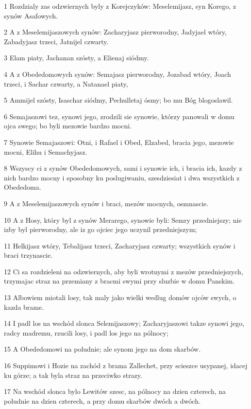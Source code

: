 \par 1 Rozdzialy zas odzwiernych byly z Korejczyków: Meselemijasz, syn Korego, z synów Asafowych.
\par 2 A z Meselemijaszowych synów: Zacharyjasz pierworodny, Jadyjael wtóry, Zabadyjasz trzeci, Jatnijel czwarty.
\par 3 Elam piaty, Jachanan szósty, a Elienaj siódmy.
\par 4 A z Obededomowych synów: Semajasz pierworodny, Jozabad wtóry, Joach trzeci, i Sachar czwarty, a Natanael piaty,
\par 5 Ammijel szósty, Isaschar siódmy, Pechulletaj ósmy; bo mu Bóg blogoslawil.
\par 6 Semajaszowi tez, synowi jego, zrodzili sie synowie, którzy panowali w domu ojca swego; bo byli mezowie bardzo mocni.
\par 7 Synowie Semajaszowi: Otni, i Rafael i Obed, Elzabed, bracia jego, mezowie mocni, Elihu i Semachyjasz.
\par 8 Wszyscy ci z synów Obededomowych, sami i synowie ich, i bracia ich, kazdy z nich bardzo mocny i sposobny ku poslugiwaniu, szesdziesiat i dwa wszystkich z Obededoma.
\par 9 A z Meselemijaszowych synów i braci, mezów mocnych, osmnascie.
\par 10 A z Hosy, który byl z synów Merarego, synowie byli: Semry przedniejszy; nie izby byl pierworodny, ale iz go ojciec jego uczynil przedniejszym;
\par 11 Helkijasz wtóry, Tebalijasz trzeci, Zacharyjasz czwarty; wszystkich synów i braci trzynascie.
\par 12 Ci sa rozdzieleni na odzwiernych, aby byli wrotnymi z mezów przedniejszych, trzymajac straz na przemiany z bracmi swymi przy sluzbie w domu Panskim.
\par 13 Albowiem miotali losy, tak maly jako wielki wedlug domów ojców swych, o kazda brame.
\par 14 I padl los na wschód slonca Selemijaszowy; Zacharyjaszowi takze synowi jego, radcy madremu, rzucili losy, i padl los jego na pólnocy;
\par 15 A Obededomowi na poludnie; ale synom jego na dom skarbów.
\par 16 Suppimowi i Hozie na zachód z brama Zallechet, przy scieszce usypanej, idacej ku górze; a tak byla straz na przeciwko strazy.
\par 17 Na wschód slonca bylo Lewitów szesc, na pólnocy na dzien czterech, na poludnie na dzien czterech, a przy domu skarbów dwóch a dwóch.
